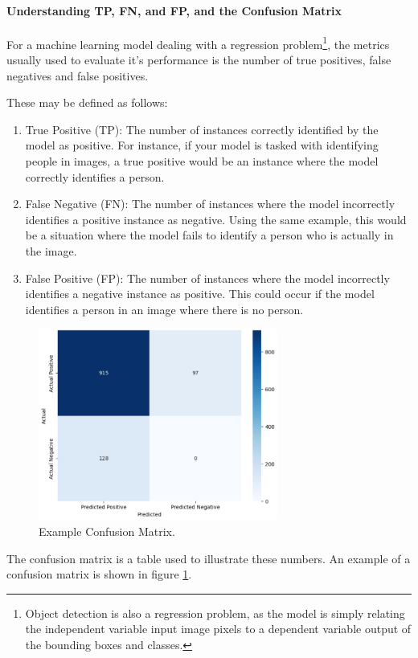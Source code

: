 \paragraph{Understanding TP, FN, and FP, and the Confusion Matrix}
\label{sec:understandingtp}
For a machine learning model dealing with a regression problem\footnote{Object detection is also a regression problem, as the model is simply relating the independent variable input image pixels to a dependent variable output of the bounding boxes and classes.}, the metrics usually used to evaluate it's performance is the number of true positives, false negatives and false positives. 

These may be defined as follows:
\begin{enumerate}
    \item True Positive (TP): The number of instances correctly identified by the model as positive. For instance, if your model is tasked with identifying people in images, a true positive would be an instance where the model correctly identifies a person.
    \item False Negative (FN): The number of instances where the model incorrectly identifies a positive instance as negative. Using the same example, this would be a situation where the model fails to identify a person who is actually in the image.
    \item False Positive (FP): The number of instances where the model incorrectly identifies a negative instance as positive. This could occur if the model identifies a person in an image where there is no person.
\end{enumerate}

\begin{figure}
    \vspace{-20pt}
    \centering
    \includegraphics[width=0.7\textwidth]{Images/Diagrams/confusion_matrix.png}
    \caption{Example Confusion Matrix.}
    \label{fig:confusion_matrix}
    \vspace{-20pt} 
\end{figure}
The confusion matrix is a table used to illustrate these numbers. An example of a confusion matrix is shown in figure \ref{fig:confusion_matrix}. 

